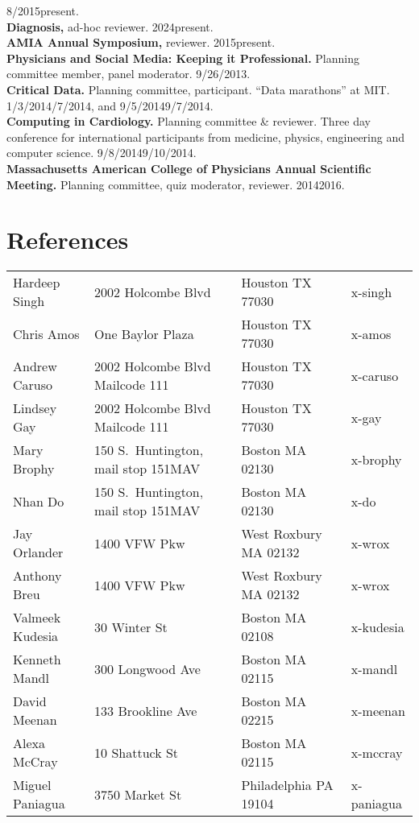 \documentclass[10pt]{article}
\begin{document}
8/2015\ndash{}present.\\
\textbf{Diagnosis,} ad-hoc reviewer. 2024\ndash{}present.\\
\textbf{AMIA Annual Symposium,} reviewer. 2015\ndash{}present.\\
\textbf{Physicians and Social Media: Keeping it Professional.}
Planning committee member, panel moderator. 9/26/2013.\\
\textbf{Critical Data.} Planning committee, participant. ``Data
marathons'' at MIT. 1/3/2014\ndash{}/7/2014, and
9/5/2014\ndash{}9/7/2014.\\
\textbf{Computing in Cardiology.} Planning committee \& reviewer.
Three day conference for international participants from medicine,
physics, engineering and computer science.
9/8/2014\ndash{}9/10/2014.\\
\textbf{Massachusetts American College of Physicians Annual Scientific
  Meeting.} Planning committee, quiz moderator, reviewer.
2014\ndash{}2016.




\section*{References}
\begin{tabular}{llll}

Hardeep Singh & 2002 Holcombe Blvd              & Houston TX 77030 & x-singh\\
Chris Amos    & One Baylor Plaza                & Houston TX 77030 & x-amos\\
Andrew Caruso & 2002 Holcombe Blvd Mailcode 111 & Houston TX 77030 & x-caruso\\
Lindsey Gay   & 2002 Holcombe Blvd Mailcode 111 & Houston TX 77030 & x-gay\\
\hline
Mary Brophy & 150 S.\ Huntington, mail stop 151MAV & Boston MA 02130 & x-brophy\\
Nhan Do     & 150 S.\ Huntington, mail stop 151MAV & Boston MA 02130 & x-do\\

Jay Orlander    & 1400 VFW Pkw      & West Roxbury MA 02132 & x-wrox\\
Anthony Breu    & 1400 VFW Pkw      & West Roxbury MA 02132 & x-wrox\\
Valmeek Kudesia & 30 Winter St      & Boston MA 02108       & x-kudesia\\
Kenneth Mandl   & 300 Longwood Ave  & Boston MA 02115       & x-mandl\\
David Meenan    & 133 Brookline Ave & Boston MA 02215       & x-meenan\\
Alexa McCray    & 10 Shattuck St    & Boston MA 02115       & x-mccray\\
Miguel Paniagua & 3750 Market St    & Philadelphia PA 19104 & x-paniagua
\end{tabular}
\end{document}
